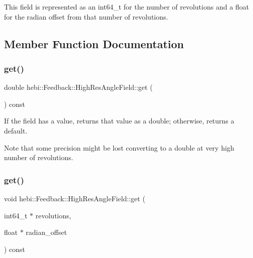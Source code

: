 This field is represented as an int64\+\_\+t for the number of revolutions and a float for the radian offset from that number of revolutions. 

\subsection{Member Function Documentation}
\mbox{\label{classhebi_1_1Feedback_1_1HighResAngleField_a3a82e8133790fe8ae94ae3ac6dd357f5}} 
\subsubsection{\texorpdfstring{get()}{get()}\hspace{0.1cm}{\footnotesize\ttfamily [1/2]}}
{\footnotesize\ttfamily double hebi\+::\+Feedback\+::\+High\+Res\+Angle\+Field\+::get (\begin{DoxyParamCaption}{ }\end{DoxyParamCaption}) const}



If the field has a value, returns that value as a double; otherwise, returns a default. 

Note that some precision might be lost converting to a double at very high number of revolutions. \mbox{\label{classhebi_1_1Feedback_1_1HighResAngleField_a1303fa3a68aeb90f36711389d507c027}} 
\subsubsection{\texorpdfstring{get()}{get()}\hspace{0.1cm}{\footnotesize\ttfamily [2/2]}}
{\footnotesize\ttfamily void hebi\+::\+Feedback\+::\+High\+Res\+Angle\+Field\+::get (\begin{DoxyParamCaption}\item[{int64\+\_\+t $\ast$}]{revolutions,  }\item[{float $\ast$}]{radian\+\_\+offset }\end{DoxyParamCaption}) const}



